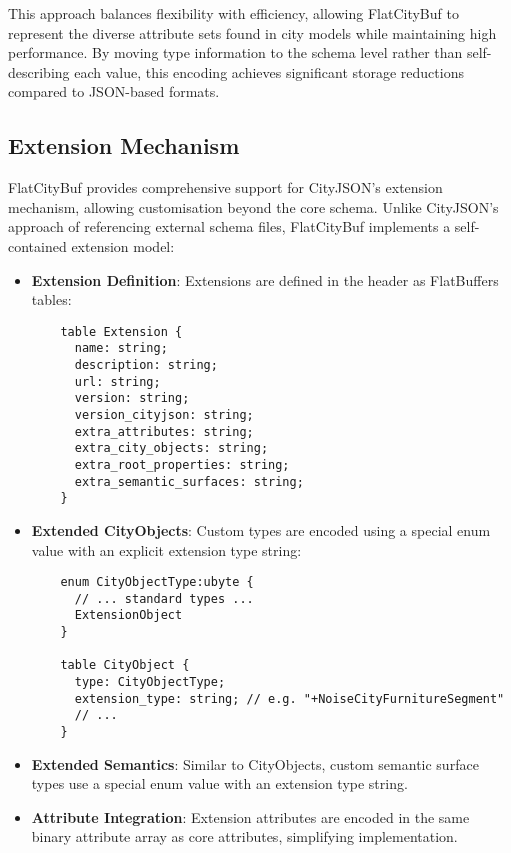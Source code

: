 This approach balances flexibility with efficiency, allowing FlatCityBuf to represent the diverse attribute sets found in city models while maintaining high performance. By moving type information to the schema level rather than self-describing each value, this encoding achieves significant storage reductions compared to JSON-based formats.

\subsection{Extension Mechanism}
\label{subsec:extension_mechanism}

FlatCityBuf provides comprehensive support for CityJSON's extension mechanism, allowing customisation beyond the core schema. Unlike CityJSON's approach of referencing external schema files, FlatCityBuf implements a self-contained extension model:

\begin{itemize}
    \item \textbf{Extension Definition}: Extensions are defined in the header as FlatBuffers tables:

    \begin{verbatim}
    table Extension {
      name: string;
      description: string;
      url: string;
      version: string;
      version_cityjson: string;
      extra_attributes: string;
      extra_city_objects: string;
      extra_root_properties: string;
      extra_semantic_surfaces: string;
    }
    \end{verbatim}

    \item \textbf{Extended CityObjects}: Custom types are encoded using a special enum value with an explicit extension type string:

    \begin{verbatim}
    enum CityObjectType:ubyte {
      // ... standard types ...
      ExtensionObject
    }

    table CityObject {
      type: CityObjectType;
      extension_type: string; // e.g. "+NoiseCityFurnitureSegment"
      // ...
    }
    \end{verbatim}

    \item \textbf{Extended Semantics}: Similar to CityObjects, custom semantic surface types use a special enum value with an extension type string.

    \item \textbf{Attribute Integration}: Extension attributes are encoded in the same binary attribute array as core attributes, simplifying implementation.
\end{itemize}


